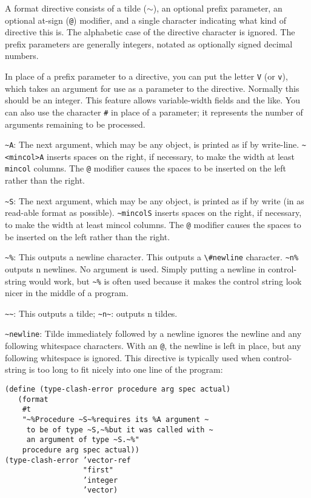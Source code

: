 \documentclass{article}
\begin{document}
A format directive consists of a tilde (\ensuremath{\sim}), an optional prefix parameter, an
optional at-sign (\verb|@|) modifier, and a single character indicating what kind of
directive this is. The alphabetic case of the directive character is ignored. The prefix
parameters are generally integers, notated as optionally signed decimal numbers.

In place of a prefix parameter to a directive, you can put the letter \verb|V| (or
\verb|v|), which takes an argument for use as a parameter to the directive. Normally this
should be an integer. This feature allows variable-width fields and the like. You can also use
the character \verb|#| in place of a parameter; it represents the number of arguments
remaining to be processed.

\verb|~A|: The next argument, which may be any object, is printed as if by
write-line. \verb|~<mincol>A| inserts spaces on the right, if necessary, to
make the width at least \verb|mincol| columns. The \verb|@| modifier causes the spaces to be
inserted on the left rather than the right.

\verb|~S|: The next argument, which may be any object, is printed as if by write (in
as read-able format as possible). \verb|~mincolS| inserts spaces on the
right, if necessary, to make the width at least mincol columns. The \verb|@| modifier causes
the spaces to be inserted on the left rather than the right.

\verb|~%|: This outputs a newline character. This outputs a
\verb|\#newline| character. \verb|~n%| outputs n newlines. No
argument is used. Simply putting a newline in control-string would work, but
\verb|~%| is often used because it makes the control string look nicer in
the middle of a program.

\verb|~~|: This outputs a tilde; \verb|~n~|: outputs n tildes.

\verb|~newline|: Tilde immediately followed by a newline ignores the newline and any
following whitespace characters. With an \verb|@|, the newline is left in place, but any
following whitespace is ignored. This directive is typically used when control-string is too
long to fit nicely into one line of the program:

\begin{verbatim}
(define (type-clash-error procedure arg spec actual)
   (format
    #t
    "~%Procedure ~S~%requires its %A argument ~
     to be of type ~S,~%but it was called with ~
     an argument of type ~S.~%"
    procedure arg spec actual))
(type-clash-error ’vector-ref
                  "first"
                  ’integer
                  ’vector)
\end{verbatim}
\end{document}
